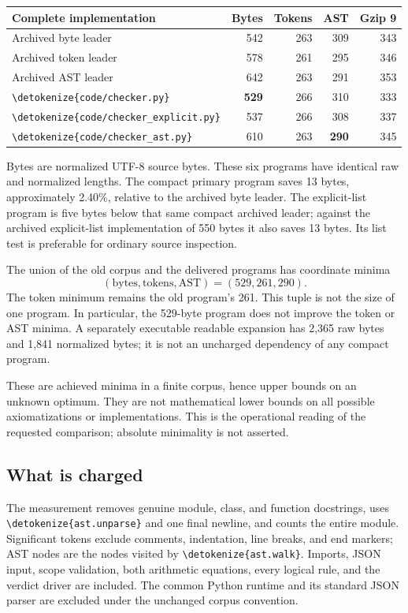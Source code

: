 \documentclass[11pt,letterpaper]{article}
\theoremstyle{definition}\newtheorem{definition}[theorem]{Definition}
\theoremstyle{remark}\newtheorem{remark}[theorem]{Remark}
\newcommand{\file}[1]{\expandafter\nolinkurl\expandafter{\detokenize{#1}}}
\begin{document}
\begin{center}\small
\begin{tabular}{lrrrr}
\toprule
Complete implementation & Bytes & Tokens & AST & Gzip 9\\
\midrule
Archived byte leader &542&263&309&343\\
Archived token leader &578&261&295&346\\
Archived AST leader &642&263&291&353\\
\midrule
\file{code/checker.py} &\textbf{529}&266&310&333\\
\file{code/checker_explicit.py} &537&266&308&337\\
\file{code/checker_ast.py} &610&263&\textbf{290}&345\\
\bottomrule
\end{tabular}
\end{center}

Bytes are normalized UTF-8 source bytes. These six programs have identical
raw and normalized lengths. The compact primary program saves 13 bytes,
approximately 2.40\%, relative to the archived byte leader. The explicit-list
program is five bytes below that same compact archived leader; against the
archived explicit-list implementation of 550 bytes it also saves 13 bytes.
Its list test is preferable for ordinary source inspection.

The union of the old corpus and the delivered programs has coordinate minima
\[
  (\text{bytes},\text{tokens},\text{AST})=(529,261,290).
\]
The token minimum remains the old program's 261. This tuple is not the size
of one program. In particular, the 529-byte program does not improve the
token or AST minima. A separately executable readable expansion has 2,365
raw bytes and 1,841 normalized bytes; it is not an uncharged dependency of
any compact program.

These are achieved minima in a finite corpus, hence upper bounds on an
unknown optimum. They are not mathematical lower bounds on all possible
axiomatizations or implementations. This is the operational reading of the
requested comparison; absolute minimality is not asserted.

\subsection{What is charged}

The measurement removes genuine module, class, and function docstrings,
uses \file{ast.unparse} and one final newline, and counts the entire module.
Significant tokens exclude comments, indentation, line breaks, and end markers;
AST nodes are the nodes visited by \file{ast.walk}. Imports, JSON input,
scope validation, both arithmetic equations, every logical rule, and the
verdict driver are included. The common Python runtime and its standard
JSON parser are excluded under the unchanged corpus convention.
\end{document}
